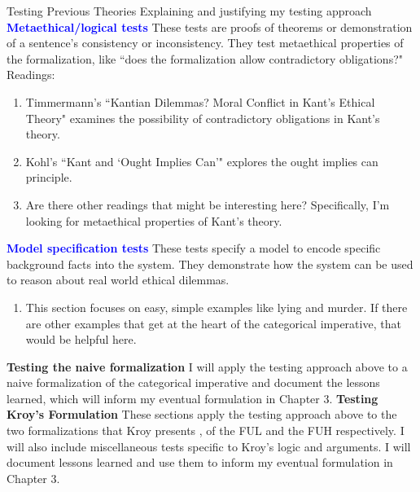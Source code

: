 \documentclass[11pt]{article}
\begin{document}
\begin{outline}[enumerate]
\1[Chapter 2:] Testing Previous Theories
\2 Explaining and justifying my testing approach
\3 \textcolor{blue}{\textbf{Metaethical/logical tests}} These tests are proofs of theorems or demonstration of a sentence's consistency or inconsistency. They test metaethical properties of the formalization, like ``does the formalization allow contradictory obligations?" Readings:
\begin{enumerate}
    \item Timmermann's ``Kantian Dilemmas? Moral Conflict in Kant’s Ethical Theory"  \cite{contradictoryob} examines the possibility of contradictory obligations in Kant's theory.
    \item Kohl's ``Kant and `Ought Implies Can'" \cite{kohl} explores the ought implies can principle.
    \item Are there other readings that might be interesting here? Specifically, I'm looking for metaethical properties of Kant's theory.
\end{enumerate}
\3 \textcolor{blue}{\textbf{Model specification tests}} These tests specify a model to encode specific background facts into the system. They demonstrate how the system can be used to reason about real world ethical dilemmas.
\begin{enumerate}
    \item This section focuses on easy, simple examples like lying and murder. If there are other examples that get at the heart of the categorical imperative, that would be helpful here.
\end{enumerate} 

\color{black}
\3 \textbf{Testing the naive formalization} I will apply the testing approach above to a naive formalization of the categorical imperative and document the lessons learned, which will inform my eventual formulation in Chapter 3.
\3 \textbf{Testing Kroy's Formulation} These sections apply the testing approach above to the two formalizations that Kroy presents \cite{kroy}, of the FUL and the FUH respectively. I will also include miscellaneous tests specific to Kroy's logic and arguments. I will document lessons learned and use them to inform my eventual formulation in Chapter 3.



\end{outline}
\end{document}
